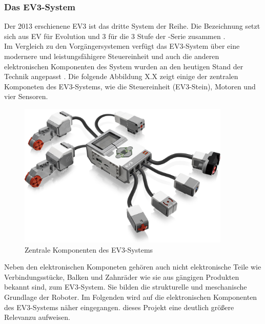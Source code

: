 \subsubsection{Das EV3-System}
\color{finishing}
Der 2013 erschienene EV3 ist das dritte System der \LM{} Reihe. Die Bezeichnung setzt sich aus EV für Evolution 
und 3 für die 3 Stufe der \LM{}-Serie zusammen \cite[vgl.][Seite 21]{Scholz.DasEV3}. \\
Im Vergleich zu den Vorgängersystemen verfügt das EV3-System über eine modernere und leistungsfähigere Steuereinheit und auch die anderen elektronischen Komponenten des System wurden an den heutigen Stand der Technik 
angepasst \cite[vgl.][Seite 22]{Scholz.DasEV3}.
\medskip
\newline
Die folgende Abbildung X.X zeigt einige der zentralen Komponeten des EV3-Systems, wie die Steuereinheit (EV3-Stein), Motoren und vier Sensoren.
\begin{figure}[ht]
	\centering
	\includegraphics[width=0.90\textwidth]{images/technische_grundlagen/EV3-Overview.png}
	\caption[Zentrale Komponenten des EV3-Systems]{Zentrale Komponenten des EV3-Systems}
	\label{fig:<Sprungmakre>}
\end{figure}
\newline
Neben den elektronischen Komponeten gehören auch nicht elektronische Teile wie Verbindungsstücke, Balken und Zahnräder 
wie sie aus gängigen \LE{} Produkten bekannt sind, zum EV3-System. Sie bilden die strukturelle und meschanische Grundlage 
der Roboter.
\medskip
\newline
Im Folgenden wird auf die elektronischen Komponenten des EV3-Systems näher eingegangen.
dieses Projekt eine deutlich größere Relevanzu aufweisen.

